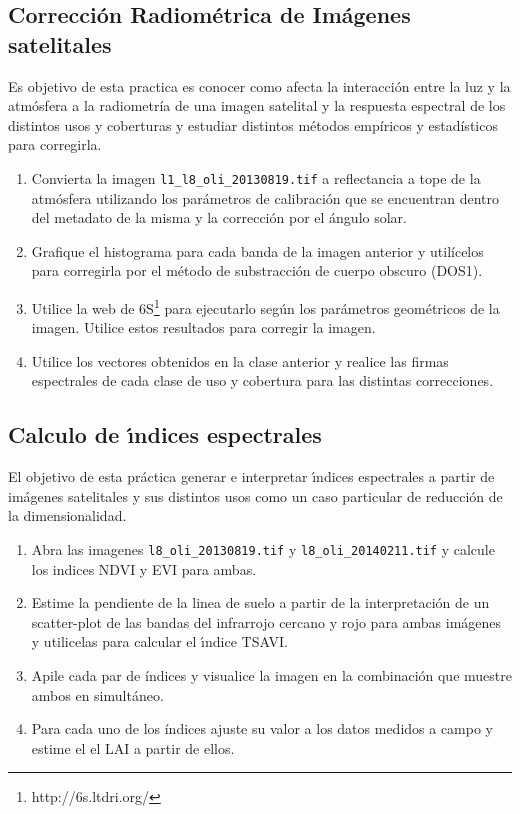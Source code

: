 \documentclass[hidelinks,12pt]{article}
\begin{document}
\subsection{Corrección Radiométrica de Imágenes satelitales}
Es objetivo de esta practica es conocer como afecta la interacción entre la luz
y la atmósfera a la radiometr\'ia de una imagen satelital y la respuesta
espectral de los distintos usos y coberturas  y estudiar distintos métodos empíricos
y estadísticos para corregirla.
\begin{enumerate}
    \item Convierta la imagen  \texttt{l1\_l8\_oli\_20130819.tif} a
    reflectancia a tope de la atmósfera utilizando los parámetros de
    calibración que se encuentran dentro del metadato de la misma y la
    corrección por el ángulo solar.
    \item Grafique el histograma para cada banda de la imagen anterior y
     utilícelos  para corregirla por el método de substracción de cuerpo
     obscuro (DOS1).
    \item Utilice la web de 6S\footnote{http://6s.ltdri.org/} para ejecutarlo
    según los parámetros geométricos de la imagen. Utilice estos resultados para
    corregir la imagen.
    \item Utilice los vectores obtenidos en la clase anterior y realice las
    firmas espectrales de cada clase de uso y cobertura para las distintas
    correcciones.
\end{enumerate}

\subsection{Calculo de \'{\i}ndices espectrales}
El objetivo de esta práctica generar e interpretar \'{\i}ndices espectrales
a partir de  imágenes satelitales y sus distintos usos como un caso
particular de reducci\'on de la dimensionalidad.

\begin{enumerate}
    \item Abra las imagenes \texttt{l8\_oli\_20130819.tif} y
        \texttt{l8\_oli\_20140211.tif} y calcule los indices NDVI y EVI
        para ambas.
    \item Estime la pendiente de la linea de suelo a partir de la
    interpretaci\'on de un scatter-plot de las bandas del infrarrojo cercano
    y rojo para ambas imágenes y utilicelas para calcular el \'{\i}ndice
    TSAVI\@.
    \item Apile cada par de  índices y visualice la imagen en la combinación
    que muestre ambos en simultáneo.
    \item Para cada uno de los índices ajuste su valor a los datos medidos a
    campo y estime el el LAI a partir de ellos.
\end{enumerate}
\end{document}
